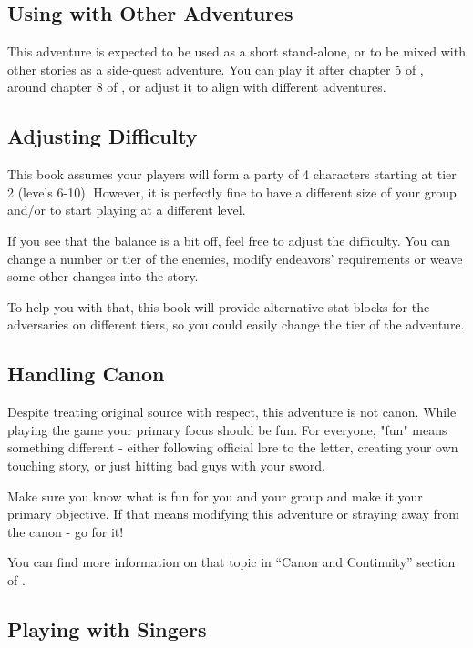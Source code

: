 \subsection{Using with Other Adventures}

This adventure is expected to be used as a short stand-alone, or to be mixed with other stories as a side-quest adventure. You can play it after chapter 5 of \bookStonewalkers{}, around chapter 8 of \bookCotU{}, or adjust it to align with different adventures.


\subsection{Adjusting Difficulty}

This book assumes your players will form a party of 4 characters starting at tier 2 (levels 6-10). However, it is perfectly fine to have a different size of your group and/or to start playing at a different level.

If you see that the balance is a bit off, feel free to adjust the difficulty. You can change a number or tier of the enemies, modify endeavors' requirements or weave some other changes into the story.

To help you with that, this book will provide alternative stat blocks for the adversaries on different tiers, so you could easily change the tier of the adventure.



\subsection{Handling Canon}
\label{ssec:runningAdventureCanon}

Despite treating original source with respect, this adventure is not canon. While playing the game your primary focus should be fun. For everyone, "fun" means something different - either following official lore to the letter, creating your own touching story, or just hitting bad guys with your sword. 

Make sure you know what is fun for you and your group and make it your primary objective. If that means modifying this adventure or straying away from the canon - go for it!

You can find more information on that topic in “Canon and Continuity” section of \handbook{}.




\subsection{Playing with Singers}

